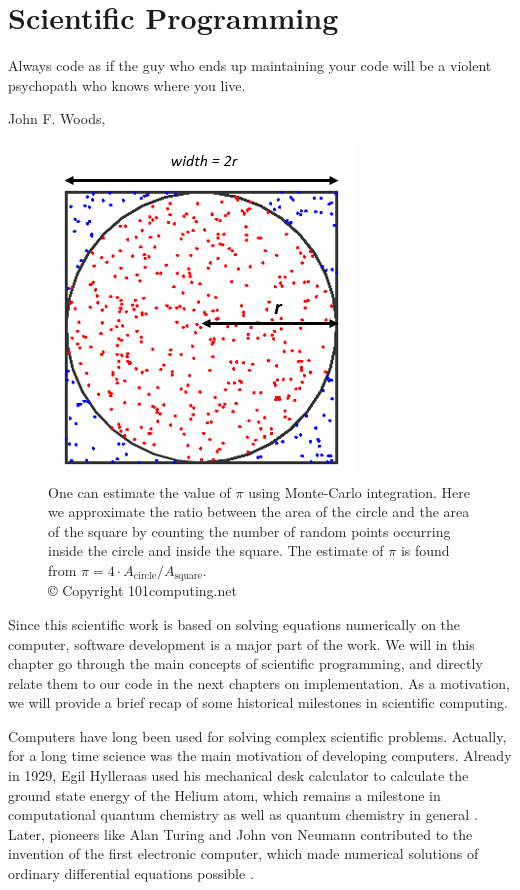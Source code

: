 \chapter{Scientific Programming} \label{chp:scientificprogramming}
\epigraph{Always code as if the guy who ends up maintaining your code will be a violent psychopath who knows where you live.}{John F. Woods, \cite{woods_usage_nodate}}
\begin{figure}[H]
	\centering
	\includegraphics[scale=0.9]{Images/montecarlointegration.png}
	\caption{One can estimate the value of $\pi$ using Monte-Carlo integration. Here we approximate the ratio between the area of the circle and the area of the square by counting the number of random points occurring inside the circle and inside the square. The estimate of $\pi$ is found from $\pi=4\cdot A_{\text{circle}}/A_{\text{square}}$.\\ © Copyright 101computing.net}
	\label{fig:montecarlointegration}
\end{figure}

Since this scientific work is based on solving equations numerically on the computer, software development is a major part of the work. We will in this chapter go through the main concepts of scientific programming, and directly relate them to our code in the next chapters on implementation. As a motivation, we will provide a brief recap of some historical milestones in scientific computing.

Computers have long been used for solving complex scientific problems. Actually, for a long time science was the main motivation of developing computers. Already in 1929, Egil Hylleraas used his mechanical desk calculator to calculate the ground state energy of the Helium atom, which remains a milestone in computational quantum chemistry as well as quantum chemistry in general \cite{helgaker_perspective_2000}. Later, pioneers like Alan Turing and John von Neumann contributed to the invention of the first electronic computer, which made numerical solutions of ordinary differential equations possible \cite{gustafsson_scientific_2018}. 

